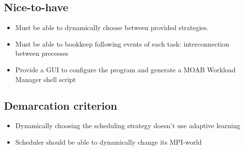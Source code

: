 	\subsection{Nice-to-have}
		\begin{itemize}
			\item Must be able to dynamically choose between provided strategies.
			\item Must be able to bookkeep following events of each task:
				\subitem interconnection between precesses
			\item Provide a GUI to configure the program and generate a MOAB Workload Manager shell script
		\end{itemize}
	\subsection{Demarcation criterion}
		\begin{itemize}
			\item Dynamically choosing the scheduling strategy doesn't use adaptive learning
			\item Scheduler should be able to dynamically change its MPI-world
		\end{itemize}